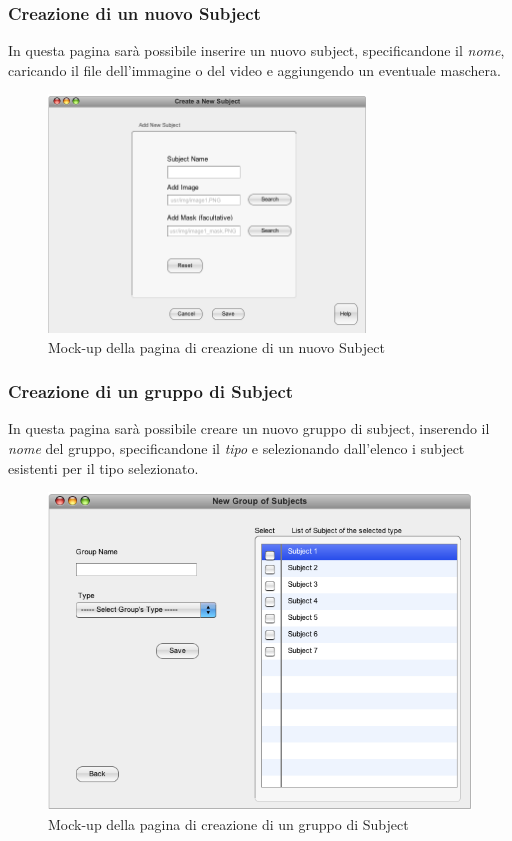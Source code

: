 \subsubsection{Creazione di un nuovo Subject}
In questa pagina sarà possibile inserire un nuovo subject\glossario{}, specificandone il \textit{nome}, caricando il file dell'immagine o del video e aggiungendo un eventuale maschera\glossario{}.
\begin{figure}[htp]
	\centering
	\includegraphics[width=0.75\textwidth]{./Content/Immagini/Prototype-v0.1/filesystemdoc_8_2}
	\caption{Mock-up della pagina di creazione di un nuovo Subject}
	\label{new_subject}
\end{figure}
\subsubsection{Creazione di un gruppo di Subject}
In questa pagina sarà possibile creare un nuovo gruppo di subject\glossario{}, inserendo il \textit{nome} del gruppo, specificandone il \textit{tipo} e selezionando dall'elenco i subject esistenti per il tipo selezionato.
\begin{figure}[htp]
	\centering
	\includegraphics[width=0.75\linewidth]{./Content/Immagini/Prototype-v0.1/filesystemdoc_8_4}
	\caption{Mock-up della pagina di creazione di un gruppo di Subject}
	\label{new_group}
\end{figure}

